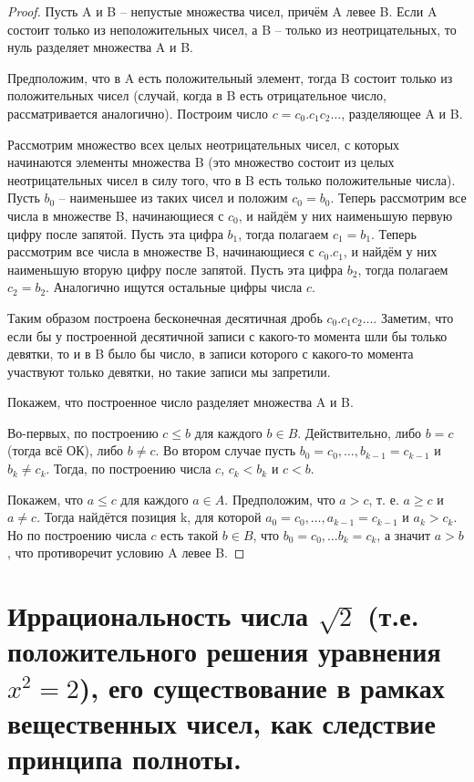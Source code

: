 \documentclass[12pt]{article}
\theoremstyle{definition}
\begin{document}
\begin{proof} Пусть A и B – непустые множества чисел, причём A левее B. Если A состоит только из неположительных чисел, а B – только из неотрицательных, то нуль разделяет множества A и B.

Предположим, что в A есть положительный элемент, тогда B состоит только из положительных чисел (случай, когда в B есть отрицательное число, рассматривается аналогично). Построим число $c=c_0.c_1 c_2\ldots$, разделяющее A и B.

Рассмотрим множество всех целых неотрицательных чисел, с которых начинаются элементы множества B (это множество состоит из целых неотрицательных чисел в силу того, что в B есть только положительные числа). Пусть $b_0$ – наименьшее из таких чисел и положим $c_0=b_0$. Теперь рассмотрим все числа в множестве B, начинающиеся с $c_0$, и найдём у них наименьшую первую цифру после запятой. Пусть эта цифра $b_1$, тогда полагаем $c_1=b_1$. Теперь рассмотрим все числа в множестве B, начинающиеся с $c_0.c_1$, и найдём у них наименьшую вторую цифру после запятой. Пусть эта цифра $b_2$, тогда полагаем $c_2=b_2$. Аналогично ищутся остальные цифры числа $c$.

Таким образом построена бесконечная десятичная дробь $c_0.c_1 c_2\ldots$. Заметим, что если бы у построенной десятичной записи с какого-то момента шли бы только девятки, то и в B было бы число, в записи которого с какого-то момента участвуют только девятки, но такие записи мы запретили.

Покажем, что построенное число разделяет множества A и B.

Во-первых, по построению $c \leq b$ для каждого $b \in B$. Действительно, либо $b=c$ (тогда всё ОК), либо $b \neq c$. Во втором случае пусть $b_0=c_0,\ldots, b_{k-1}=c_{k-1}$ и $b_k \neq c_k$. Тогда, по построению числа $c$, $c_k<b_k$ и $c<b$.

Покажем, что $a \leq c$ для каждого $a \in A$. Предположим, что $a>c$, т. е. $a \geq c$ и $a\neq c$. Тогда найдётся позиция k, для которой $a_0=c_0,\ldots, a_{k-1}=c_{k-1}$ и $a_k>c_k$. Но по построению числа $c$ есть такой $b\in B$, что $b_0=c_0,\ldots b_k=c_k$, а значит $a>b$, что противоречит условию A левее B.
\end{proof}

\section{Иррациональность числа $\sqrt{2}$ (т.е. положительного решения уравнения $x^2 = 2$), его существование в рамках вещественных чисел, как следствие принципа полноты.}
\end{document}
